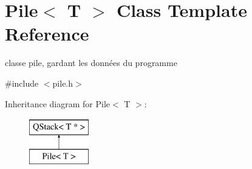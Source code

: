 \hypertarget{classPile}{
\section{Pile$<$ T $>$ Class Template Reference}
\label{classPile}
}


classe pile, gardant les données du programme  




{\ttfamily \#include $<$pile.h$>$}

Inheritance diagram for Pile$<$ T $>$:\begin{figure}[H]
\begin{center}
\leavevmode
\includegraphics[height=2cm]{classPile}
\end{center}
\end{figure}
